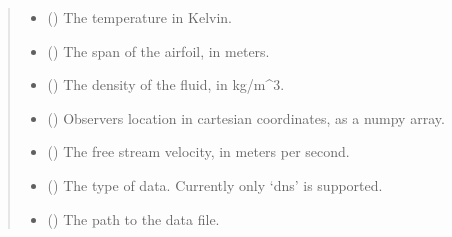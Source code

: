 \documentclass[letterpaper,10pt,english]{sphinxmanual}
\begin{document}
\begin{fulllineitems}
\begin{quote}
\begin{description}
\begin{itemize}
\item {} 
\sphinxAtStartPar
{} () \textendash{} The temperature in Kelvin.

\item {} 
\sphinxAtStartPar
{} () \textendash{} The span of the airfoil, in meters.

\item {} 
\sphinxAtStartPar
{} () \textendash{} The density of the fluid, in kg/m\textasciicircum{}3.

\item {} 
\sphinxAtStartPar
{} () \textendash{} Observers location in cartesian coordinates, as a numpy array.

\item {} 
\sphinxAtStartPar
{} () \textendash{} The free stream velocity, in meters per second.

\item {} 
\sphinxAtStartPar
{} () \textendash{} The type of data. Currently only ‘dns’ is supported.

\item {} 
\sphinxAtStartPar
{} () \textendash{} The path to the data file.

\end{itemize}

\end{description}\end{quote}

\begin{fulllineitems}
\label{\detokenize{io:amiet_self_noise.io_utils.ConfigData.L}}
\pysigstartsignatures
\pysigline
{}
\pysigstopsignatures
\end{fulllineitems}


\end{fulllineitems}
\end{document}
